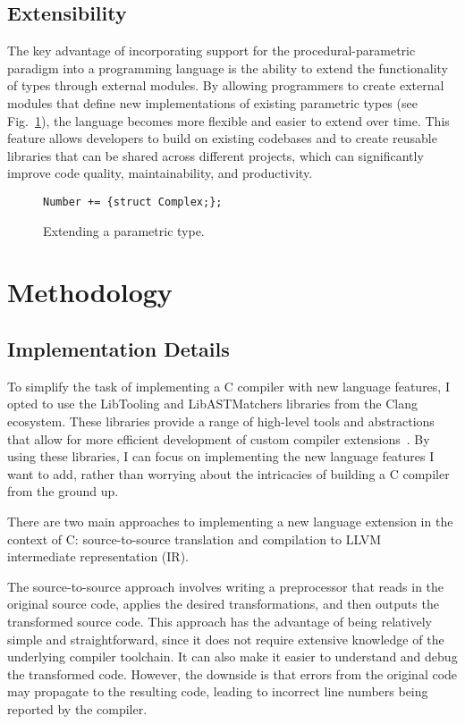 \documentclass[conference]{IEEEtran}
\begin{document}
\subsection{Extensibility}
The key advantage of incorporating support for the pro\-ce\-dur\-al-parametric paradigm into a programming language is the ability to extend the functionality of types through external modules.
By allowing programmers to create external modules that define new implementations of existing parametric types (see Fig.~\ref{fig:extend}), the language becomes more flexible and easier to extend over time.
This feature allows developers to build on existing codebases and to create reusable libraries that can be shared across different projects, which can significantly improve code quality, maintainability, and productivity.

\begin{figure}[htbp]
  \begin{lstlisting}[frame=single,basicstyle=\ttfamily]
Number += {struct Complex;};
  \end{lstlisting}
  \caption{Extending a parametric type.}
  \label{fig:extend}
\end{figure}

\section{Methodology}

\subsection{Implementation Details}
To simplify the task of implementing a C compiler with new language features, I opted to use the LibTooling and LibASTMatchers libraries from the Clang ecosystem.
These libraries provide a range of high-level tools and abstractions that allow for more efficient development of custom compiler extensions~\cite{LibTooling}.
By using these libraries, I can focus on implementing the new language features I want to add, rather than worrying about the intricacies of building a C compiler from the ground up.

There are two main approaches to implementing a new language extension in the context of C: source-to-source translation and compilation to LLVM~\cite{llvm} intermediate representation (IR).

The source-to-source approach involves writing a preprocessor that reads in the original source code, applies the desired transformations, and then outputs the transformed source code.
This approach has the advantage of being relatively simple and straightforward, since it does not require extensive knowledge of the underlying compiler toolchain.
It can also make it easier to understand and debug the transformed code.
However, the downside is that errors from the original code may propagate to the resulting code, leading to incorrect line numbers being reported by the compiler.
\end{document}
